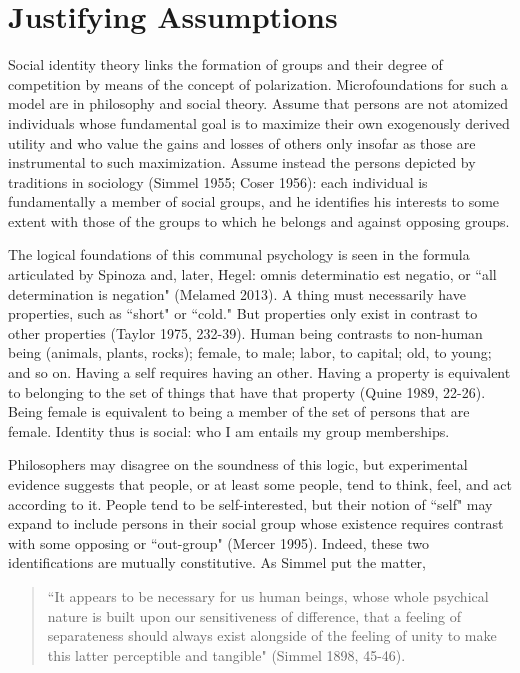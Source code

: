 \documentclass[12pt]{article}
\begin{document}
\section*{Justifying Assumptions}
Social identity theory links the formation of groups and their degree of competition by means of the concept of polarization.  Microfoundations for such a model are in philosophy and social theory.  Assume that persons are not atomized individuals whose fundamental goal is to maximize their own exogenously derived utility and who value the gains and losses of others only insofar as those are instrumental to such maximization.  Assume instead the persons depicted by traditions in sociology (Simmel 1955; Coser 1956):  each individual is fundamentally a member of social groups, and he identifies his interests to some extent with those of the groups to which he belongs and against opposing groups.

The logical foundations of this communal psychology is seen in the formula articulated by Spinoza and, later, Hegel:  omnis determinatio est negatio, or ``all determination is negation" (Melamed 2013).  A thing must necessarily have properties, such as ``short" or ``cold."  But properties only exist in contrast to other properties (Taylor 1975, 232-39).  Human being contrasts to non-human being (animals, plants, rocks); female, to male; labor, to capital; old, to young; and so on.  Having a self requires having an other.   Having a property is equivalent to belonging to the set of things that have that property (Quine 1989, 22-26).  Being female is equivalent to being a member of the set of persons that are female.  Identity thus is social:  who I am entails my group memberships.

Philosophers may disagree on the soundness of this logic, but experimental evidence suggests that people, or at least some people, tend to think, feel, and act according to it.  People tend to be self-interested, but their notion of ``self" may expand to include persons in their social group whose existence requires contrast with some opposing or ``out-group" (Mercer 1995).  Indeed, these two identifications are mutually constitutive.  As Simmel put the matter,
\begin{quotation}
	``It appears to be necessary for us human beings, whose whole psychical nature is built upon our sensitiveness of difference, that a feeling of separateness should always exist alongside of the feeling of unity to make this latter perceptible and tangible" (Simmel 1898, 45-46).  
\end{quotation} 
\end{document}
